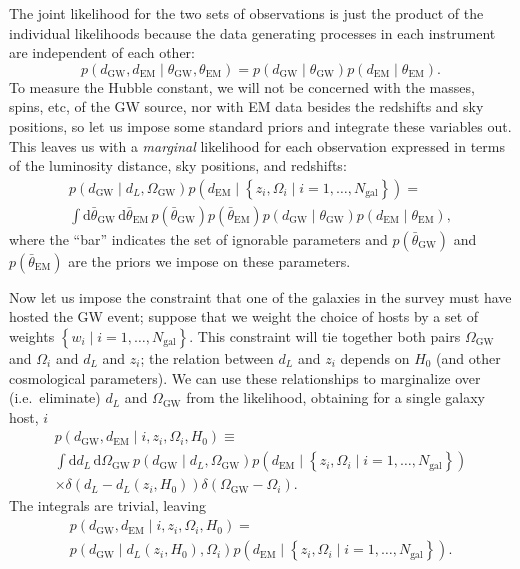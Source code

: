 \documentclass[modern]{aastex62}
\newcommand{\dd}{\mathrm{d}}
\newcommand{\dEM}{d_{\mathrm{EM}}}
\newcommand{\dGW}{d_{\mathrm{GW}}}
\newcommand{\Ngal}{N_{\mathrm{gal}}}
\newcommand{\OGW}{\Omega_{\mathrm{GW}}}
\newcommand{\thetaEM}{\theta_{\mathrm{EM}}}
\newcommand{\thetaGW}{\theta_{\mathrm{GW}}}
\begin{document}
The joint likelihood for the two sets of observations is just the product of the
individual likelihoods because the data generating processes in each instrument
are independent of each other:
%
\begin{equation}
    p\left( \dGW, \dEM \mid \thetaGW, \thetaEM \right) =  p\left( \dGW \mid \thetaGW \right) p\left( \dEM \mid \thetaEM \right).
\end{equation}
%
To measure the Hubble constant, we will not be concerned with the masses, spins,
etc, of the \ac{GW} source, nor with \ac{EM} data besides the redshifts and sky
positions, so let us impose some standard priors and integrate these variables
out.  This leaves us with a \emph{marginal} likelihood for each observation
expressed in terms of the luminosity distance, sky positions, and redshifts:
%
\begin{multline}
    p\left( \dGW \mid d_L, \OGW \right) p\left( \dEM \mid \left\{ z_i, \Omega_i \mid i = 1, \ldots, \Ngal \right\} \right) = \\ \int \dd \bar{\theta}_{\mathrm{GW}} \, \dd \bar{\theta}_{\mathrm{EM}} \, p\left( \bar{\theta}_{\mathrm{GW}} \right) p\left( \bar{\theta}_{\mathrm{EM}} \right) p\left( \dGW \mid \thetaGW \right) p\left( \dEM \mid \thetaEM \right),
\end{multline}
%
where the ``bar'' indicates the set of ignorable parameters and $p\left(
\bar{\theta}_{\mathrm{GW}} \right)$ and $p\left( \bar{\theta}_{\mathrm{EM}}
\right)$ are the priors we impose on these parameters.

Now let us impose the constraint that one of the galaxies in the survey must
have hosted the \ac{GW} event; suppose that we weight the choice of hosts by a
set of weights $\left\{ w_i \mid i = 1, \ldots, \Ngal \right\}$.  This
constraint will tie together both pairs $\OGW$ and $\Omega_i$ and $d_L$ and
$z_i$; the relation between $d_L$ and $z_i$ depends on $H_0$ (and other
cosmological parameters).  We can use these relationships to marginalize over
(i.e.\ eliminate) $d_L$ and $\OGW$ from the likelihood, obtaining for a single
galaxy host, $i$
%
\begin{multline}
    p\left( \dGW, \dEM \mid i, z_i, \Omega_i, H_0 \right) \equiv \\ \int \dd d_L \, \dd \OGW \, p\left( \dGW \mid d_L, \OGW \right) p\left( \dEM \mid \left\{ z_i, \Omega_i \mid i = 1, \ldots, \Ngal \right\} \right)  \\ \times \delta\left( d_L - d_L\left( z_i, H_0 \right) \right) \delta \left( \OGW - \Omega_i \right).
\end{multline}
%
The integrals are trivial, leaving
%
\begin{multline}
    p\left( \dGW, \dEM \mid i, z_i, \Omega_i, H_0 \right) = \\ p\left( \dGW \mid d_L\left( z_i, H_0 \right), \Omega_i \right) p\left( \dEM \mid \left\{ z_i, \Omega_i \mid i = 1, \ldots, \Ngal \right\} \right).
\end{multline}
\end{document}
